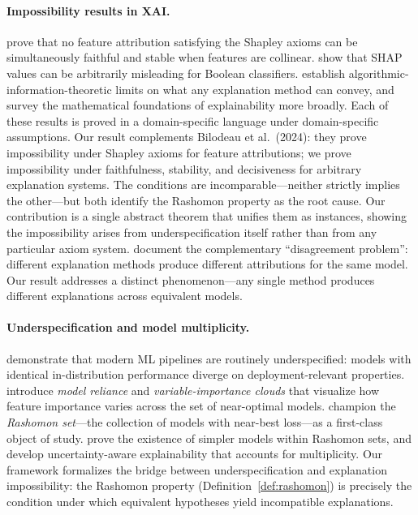
\paragraph{Impossibility results in XAI.}
\citet{bilodeau2024impossibility} prove that no feature attribution satisfying
the Shapley axioms can be simultaneously faithful and stable when features are
collinear.  \citet{huang2024failings} show that SHAP values can be arbitrarily
misleading for Boolean classifiers.  \citet{rao2025limits} establish
algorithmic-information-theoretic limits on what any explanation method can
convey, and \citet{noguer2025mathematical} survey the mathematical foundations
of explainability more broadly.  Each of these results is proved in a
domain-specific language under domain-specific assumptions.  Our result
complements Bilodeau et al.\ (2024): they prove impossibility under Shapley
axioms for feature attributions; we prove impossibility under faithfulness,
stability, and decisiveness for arbitrary explanation systems.  The conditions
are incomparable---neither strictly implies the other---but both identify the
Rashomon property as the root cause.  Our contribution is a single abstract
theorem that unifies them as instances, showing the impossibility arises from
underspecification itself rather than from any particular axiom system.
\citet{krishna2022disagreement} document the complementary ``disagreement
problem'': different explanation methods produce different attributions for the
same model.  Our result addresses a distinct phenomenon---any single method
produces different explanations across equivalent models.

\paragraph{Underspecification and model multiplicity.}
\citet{damour2022underspecification} demonstrate that modern ML pipelines are
routinely underspecified: models with identical in-distribution performance
diverge on deployment-relevant properties.
\citet{fisher2019models} introduce \emph{model reliance} and
\emph{variable-importance clouds} that visualize how feature importance varies
across the set of near-optimal models.
\citet{rudin2024amazing} champion the \emph{Rashomon set}---the collection of
models with near-best loss---as a first-class object of study.
\citet{semenova2022existence} prove the existence of simpler models within
Rashomon sets, and \citet{marx2024uncertainty} develop uncertainty-aware
explainability that accounts for multiplicity.  Our framework formalizes the
bridge between underspecification and explanation impossibility: the Rashomon
property (Definition~\ref{def:rashomon}) is precisely the condition under which
equivalent hypotheses yield incompatible explanations.

